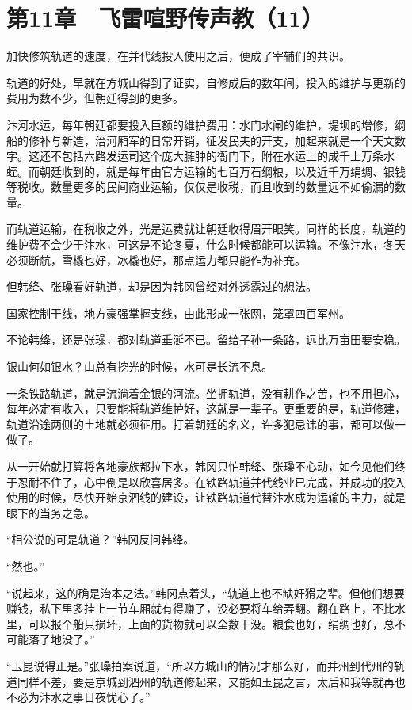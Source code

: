 \section{第11章　飞雷喧野传声教（11）}

加快修筑轨道的速度，在并代线投入使用之后，便成了宰辅们的共识。

轨道的好处，早就在方城山得到了证实，自修成后的数年间，投入的维护与更新的费用为数不少，但朝廷得到的更多。

汴河水运，每年朝廷都要投入巨额的维护费用：水门水闸的维护，堤坝的增修，纲船的修补与新造，治河厢军的日常开销，征发民夫的开支，加起来就是一个天文数字。这还不包括六路发运司这个庞大臃肿的衙门下，附在水运上的成千上万条水蛭。而朝廷收到的，就是每年由官方运输的七百万石纲粮，以及近千万绢绸、银钱等税收。数量更多的民间商业运输，仅仅是收税，而且收到的数量远不如偷漏的数量。

而轨道运输，在税收之外，光是运费就让朝廷收得眉开眼笑。同样的长度，轨道的维护费不会少于汴水，可这是不论冬夏，什么时候都能可以运输。不像汴水，冬天必须断航，雪橇也好，冰橇也好，那点运力都只能作为补充。

但韩绛、张璪看好轨道，却是因为韩冈曾经对外透露过的想法。

国家控制干线，地方豪强掌握支线，由此形成一张网，笼罩四百军州。

不论韩绛，还是张璪，都对轨道垂涎不已。留给子孙一条路，远比万亩田要安稳。

银山何如银水？山总有挖光的时候，水可是长流不息。

一条铁路轨道，就是流淌着金银的河流。坐拥轨道，没有耕作之苦，也不用担心，每年必定有收入，只要能将轨道维护好，这就是一辈子。更重要的是，轨道修建，轨道沿途两侧的土地就必须征用。打着朝廷的名义，许多犯忌讳的事，都可以做一做了。

从一开始就打算将各地豪族都拉下水，韩冈只怕韩绛、张璪不心动，如今见他们终于忍耐不住了，心中倒是以欣喜居多。在铁路轨道并代线业已完成，并成功的投入使用的时候，尽快开始京泗线的建设，让铁路轨道代替汴水成为运输的主力，就是眼下的当务之急。

“相公说的可是轨道？”韩冈反问韩绛。

“然也。”

“说起来，这的确是治本之法。”韩冈点着头，“轨道上也不缺奸猾之辈。但他们想要赚钱，私下里多挂上一节车厢就有得赚了，没必要将车给弄翻。翻在路上，不比水里，可以报个船只损坏，上面的货物就可以全数干没。粮食也好，绢绸也好，总不可能落了地没了。”

“玉昆说得正是。”张璪拍案说道，“所以方城山的情况才那么好，而并州到代州的轨道同样不差，要是京城到泗州的轨道修起来，又能如玉昆之言，太后和我等就再也不必为汴水之事日夜忧心了。”

